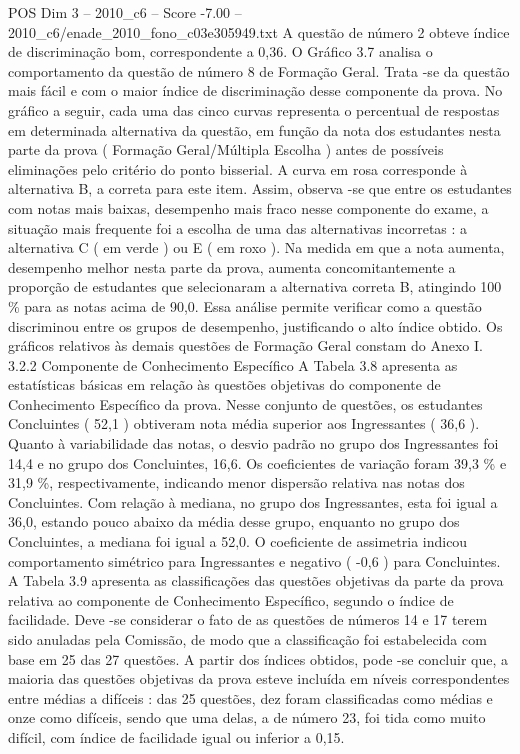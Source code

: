\begin{textsample}{POS Dim 3 – 2010\_c6 – Score -7.00 – 2010\_c6/enade\_2010\_fono\_c03e305949.txt}
A questão de número 2 obteve índice de discriminação bom, correspondente a 0,36.
O Gráfico 3.7 analisa o comportamento da questão de número 8 de Formação Geral.
Trata -se da questão mais fácil e com o maior índice de discriminação desse componente da prova.
No gráfico a seguir, cada uma das cinco curvas representa o percentual de respostas em determinada alternativa da questão, em função da nota dos estudantes nesta parte da prova ( Formação Geral/Múltipla Escolha ) antes de possíveis eliminações pelo critério do ponto bisserial.
A curva em rosa corresponde à alternativa B, a correta para este item.
Assim, observa -se que entre os estudantes com notas mais baixas, desempenho mais fraco nesse componente do exame, a situação mais frequente foi a escolha de uma das alternativas incorretas : a alternativa C ( em verde ) ou E ( em roxo ).
Na medida em que a nota aumenta, desempenho melhor nesta parte da prova, aumenta concomitantemente a proporção de estudantes que selecionaram a alternativa correta B, atingindo 100 \% para as notas acima de 90,0.
Essa análise permite verificar como a questão discriminou entre os grupos de desempenho, justificando o alto índice obtido.
Os gráficos relativos às demais questões de Formação Geral constam do Anexo I. 3.2.2 Componente de Conhecimento Específico A Tabela 3.8 apresenta as estatísticas básicas em relação às questões objetivas do componente de Conhecimento Específico da prova.
Nesse conjunto de questões, os estudantes Concluintes ( 52,1 ) obtiveram nota média superior aos Ingressantes ( 36,6 ).
Quanto à variabilidade das notas, o desvio padrão no grupo dos Ingressantes foi 14,4 e no grupo dos Concluintes, 16,6.
Os coeficientes de variação foram 39,3 \% e 31,9 \%, respectivamente, indicando menor dispersão relativa nas notas dos Concluintes.
Com relação à mediana, no grupo dos Ingressantes, esta foi igual a 36,0, estando pouco abaixo da média desse grupo, enquanto no grupo dos Concluintes, a mediana foi igual a 52,0.
O coeficiente de assimetria indicou comportamento simétrico para Ingressantes e negativo ( -0,6 ) para Concluintes.
A Tabela 3.9 apresenta as classificações das questões objetivas da parte da prova relativa ao componente de Conhecimento Específico, segundo o índice de facilidade.
Deve -se considerar o fato de as questões de números 14 e 17 terem sido anuladas pela Comissão, de modo que a classificação foi estabelecida com base em 25 das 27 questões.
A partir dos índices obtidos, pode -se concluir que, a maioria das questões objetivas da prova esteve incluída em níveis correspondentes entre médias a difíceis : das 25 questões, dez foram classificadas como médias e onze como difíceis, sendo que uma delas, a de número 23, foi tida como muito difícil, com índice de facilidade igual ou inferior a 0,15.

\end{textsample}
